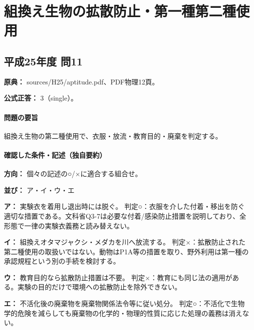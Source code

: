 \section{組換え生物の拡散防止・第一種第二種使用}

\subsection{平成25年度 問11}
\label{q:h25-reg-apt-11}

\noindent\textbf{原典：} sources/H25/aptitude.pdf、PDF物理12頁。

\textbf{公式正答：} 3（single）。

\paragraph{問題の要旨} 組換え生物の第二種使用で、衣服・放流・教育目的・廃棄を判定する。

\paragraph{確認した条件・記述（独自要約）}\mbox{}\par

\noindent\textbf{方向：} 個々の記述の○/×に適合する組合せ。\par

\noindent\textbf{並び：} ア・イ・ウ・エ\par

\noindent\textbf{ア：} 実験衣を着用し退出時には脱ぐ。 判定○：衣服を介した付着・移出を防ぐ適切な措置である。文科省Q3-7は必要な付着/感染防止措置を説明しており、全形態で一律の実験衣義務と読み替えない。\par

\noindent\textbf{イ：} 組換えオタマジャクシ・メダカを川へ放流する。 判定×：拡散防止された第二種使用の取扱いではない。動物はP1A等の措置を取り、野外利用は第一種の承認規程という別の手続を検討する。\par

\noindent\textbf{ウ：} 教育目的なら拡散防止措置は不要。 判定×：教育にも同じ法の適用がある。実験の目的だけで環境への拡散防止を除外できない。\par

\noindent\textbf{エ：} 不活化後の廃棄物を廃棄物関係法令等に従い処分。 判定○：不活化で生物学的危険を減らしても廃棄物の化学的・物理的性質に応じた処理の義務は消えない。\par

